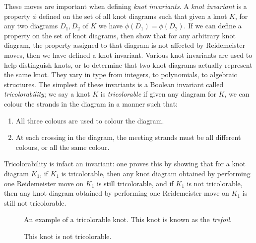 \documentclass[reqno, 12pt]{amsart}
\theoremstyle{remark}
\begin{document}
These moves are important when defining \textit{knot invariants}. 	A \textit{knot invariant} is a property $\phi$ defined on the set of all knot diagrams such that given a knot $K$, for any two diagrams $D_1, D_2$ of $K$ we have $\phi(D_1)=\phi(D_2)$. If we can define a property on the set of knot diagrams, then show that for any arbitrary knot diagram, the property assigned to that diagram is not affected by Reidemeister moves, then we have defined a knot invariant. Various knot invariants are used to help distinguish knots, or to determine that two knot diagrams actually represent the same knot. They vary in type from integers, to polynomials, to algebraic structures. The simplest of these invariants is a Boolean invariant called \textit{tricolorability}; we say a knot $K$ is \textit{tricolorable} if given any diagram for $K$, we can colour the strands in the diagram in a manner such that:
	\begin{enumerate}[nosep]
		\item All three colours are used to colour the diagram.
		\item At each crossing in the diagram, the meeting strands must be all different colours, or all the same colour.
	\end{enumerate}
	Tricolorability is infact an invariant: one proves this by showing that for a knot diagram $K_1$, if $K_1$ is tricolorable, then any knot diagram obtained by performing one Reidemeister move on $K_1$ is still tricolorable, and if $K_1$ is not tricolorable, then any knot diagram obtained by performing one Reidemeister move on $K_1$ is still not tricolorable.
\begin{figure}[htb!]
	\centering
	\caption{An example of a tricolorable knot. This knot is known as the \textit{trefoil}.}
	\label{fig:fig4}
\end{figure}

\begin{figure}[H]
	\centering
	\caption{This knot is not tricolorable. }
\end{figure}
\end{document}

